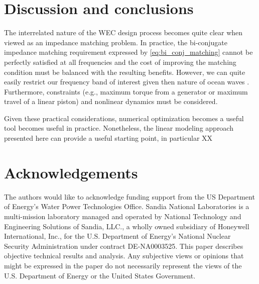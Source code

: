 \documentclass[lettersize,journal]{IEEEtran}
\begin{document}





\section{Discussion and conclusions}
The interrelated nature of the WEC design process becomes quite clear when viewed as an impedance matching problem.
In practice, the bi-conjugate impedance matching requirement expressed by \eqref{eq:bi_conj_matching} cannot be perfectly satisfied at all frequencies and the cost of improving the matching condition must be balanced with the resulting benefits.
However, we can quite easily restrict our frequency band of interest given then nature of ocean waves \cite{Coe2020a}.
Furthermore, constraints (e.g., maximum torque from a generator or maximum travel of a linear piston) and nonlinear dynamics must be considered.

Given these practical considerations, numerical optimization becomes a useful tool becomes useful in practice.
Nonetheless, the linear modeling approach presented here can provide a useful starting point, in particular XX

\section{Acknowledgements}
The authors would like to acknowledge funding support from the US Department of Energy's Water Power Technologies Office.
Sandia National Laboratories is a multi-mission laboratory managed and operated by National Technology and Engineering Solutions of Sandia, LLC., a wholly owned subsidiary of Honeywell International, Inc., for the U.S. Department of Energy's National Nuclear Security Administration under contract DE-NA0003525.
This paper describes objective technical results and analysis.
Any subjective views or opinions that might be expressed in the paper do not necessarily represent the views of the U.S. Department of Energy or the United States Government.
\end{document}
